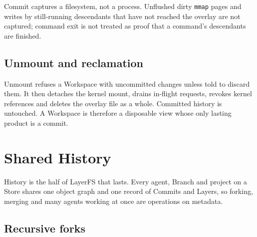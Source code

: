 \documentclass[letterpaper,twocolumn,10pt]{article}
\newcommand{\sys}{LayerFS}
\newcommand{\ws}{Workspace}
\begin{document}
Commit captures a filesystem, not a process. Unflushed dirty
\texttt{mmap} pages and writes by still-running descendants that have not
reached the overlay are not captured; command exit is not treated as proof
that a command's descendants are finished.

\subsection{Unmount and reclamation}

Unmount refuses a \ws{} with uncommitted changes unless told to discard
them. It then detaches the kernel mount, drains in-flight requests, revokes
kernel references and deletes the overlay file as a whole. Committed history
is untouched. A \ws{} is therefore a disposable view whose only lasting
product is a commit.

\section{Shared History}
\label{sec:history}

History is the half of \sys{} that lasts. Every agent, Branch and project
on a Store shares one object graph and one record of Commits and Layers, so
forking, merging and many agents working at once are operations on
metadata.

\subsection{Recursive forks}
\label{sec:fork}
\end{document}
